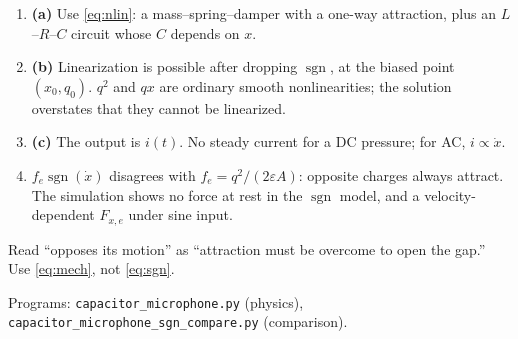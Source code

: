 \documentclass[11pt,a4paper]{article}
\begin{document}
\begin{enumerate}
  \item \textbf{(a)} Use \eqref{eq:nlin}: a mass--spring--damper with a one-way attraction,
        plus an \(L\)--\(R\)--\(C\) circuit whose \(C\) depends on \(x\).
  \item \textbf{(b)} Linearization is possible after dropping \(\operatorname{sgn}\), at the biased point \((x_0,q_0)\).
        \(q^2\) and \(qx\) are ordinary smooth nonlinearities; the solution overstates that they cannot be linearized.
  \item \textbf{(c)} The output is \(i(t)\). No steady current for a DC pressure; for AC, \(i\propto \dot{x}\).
  \item \(f_e\operatorname{sgn}(\dot{x})\) disagrees with \(f_e=q^2/(2\varepsilon A)\):
        opposite charges always attract. The simulation shows no force at rest in the \(\operatorname{sgn}\) model,
        and a velocity-dependent \(F_{x,e}\) under sine input.
\end{enumerate}

Read ``opposes its motion'' as ``attraction must be overcome to open the gap.''
Use \eqref{eq:mech}, not \eqref{eq:sgn}.

\vspace{0.6em}
\noindent Programs: \texttt{capacitor\_microphone.py} (physics),
\texttt{capacitor\_microphone\_sgn\_compare.py} (comparison).
\end{document}

